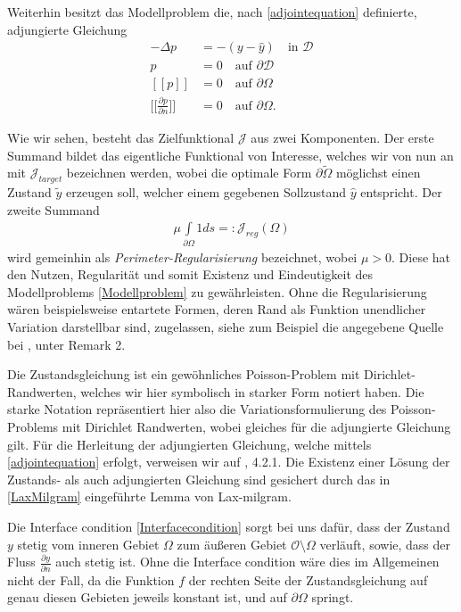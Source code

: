 \begin{defi}[Modellproblem]
	Weiterhin besitzt das Modellproblem die, nach \ref{adjointequation} 				definierte, adjungierte Gleichung 
	\begin{equation}\label{Modelladjoint}
		\begin{aligned}
		-\Delta p &= - (y - \hat{y}) \quad \text{in } \mathcal{D} \\
		p &= 0 \quad \text{auf } \partial\mathcal{D} \\
		[[p]] &= 0 \quad\text{auf } \partial\Omega \\ 
		\Big[\Big[\frac{\partial p}{\partial n}\Big]\Big] &= 0 \quad\text{auf } \partial\Omega.
		\end{aligned}
	\end{equation}	 
\end{defi}

Wie wir sehen, besteht das Zielfunktional $\mathcal{J}$ aus zwei Komponenten. Der erste Summand bildet das eigentliche Funktional von Interesse, welches wir von nun an mit $\mathcal{J}_{target}$ bezeichnen werden, wobei die optimale Form $\partial\tilde{\Omega}$ möglichst einen Zustand $\tilde{y}$ erzeugen soll, welcher einem gegebenen Sollzustand $\hat{y}$ entspricht. Der zweite Summand
\begin{align*}
	\mu\underset{\partial\Omega}{\int} 1 ds =: \mathcal{J}_{reg}(\Omega)
\end{align*}
wird gemeinhin als \textit{Perimeter-Regularisierung} bezeichnet, wobei $\mu > 0$. Diese hat den Nutzen, Regularität und somit Existenz und Eindeutigkeit des Modellproblems \ref{Modellproblem} zu gewährleisten. Ohne die Regularisierung wären beispielsweise entartete Formen, deren Rand als Funktion unendlicher Variation darstellbar sind, zugelassen, siehe zum Beispiel die angegebene Quelle bei \cite{LagrangeNewton}, unter Remark 2.

Die Zustandsgleichung ist ein gewöhnliches Poisson-Problem mit Dirichlet-Randwerten, welches wir hier symbolisch in starker Form notiert haben. Die starke Notation repräsentiert hier also die Variationsformulierung des Poisson-Problems mit Dirichlet Randwerten, wobei gleiches für die adjungierte Gleichung gilt. Für die Herleitung der adjungierten Gleichung, welche mittels \ref{adjointequation} erfolgt, verweisen wir auf \cite{shape_space}, 4.2.1. Die Existenz einer Lösung der  Zustands- als auch adjungierten Gleichung sind gesichert durch das in \ref{LaxMilgram} eingeführte Lemma von Lax-milgram.

Die Interface condition \ref{Interfacecondition} sorgt bei uns dafür, dass der Zustand $y$ stetig vom inneren Gebiet $\Omega$ zum äußeren Gebiet $\mathcal{O} \setminus \Omega$ verläuft, sowie, dass der Fluss $\frac{\partial y }{\partial n}$ auch stetig ist. Ohne die Interface condition wäre dies im Allgemeinen nicht der Fall, da die Funktion $f$ der rechten Seite der Zustandsgleichung auf genau diesen Gebieten jeweils konstant ist, und auf $\partial\Omega$ springt.

